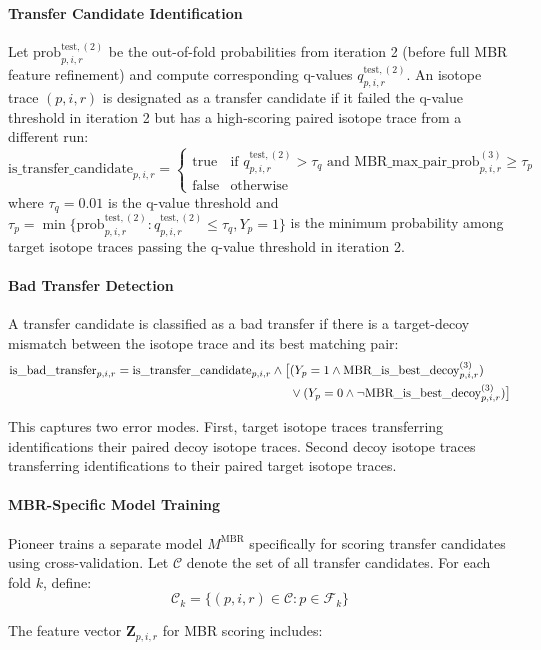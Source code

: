 \documentclass[pdflatex,sn-nature]{sn-jnl}
\begin{document}
\paragraph{Transfer Candidate Identification} Let $\text{prob}_{p,i,r}^{\text{test},(2)}$ be the out-of-fold probabilities from iteration 2 (before full MBR feature refinement) and compute corresponding q-values $q_{p,i,r}^{\text{test},(2)}$. An isotope trace $(p,i,r)$ is designated as a transfer candidate if it failed the q-value threshold in iteration 2 but has a high-scoring paired isotope trace from a different run:
\begin{equation}
  \text{is\_transfer\_candidate}_{p,i,r} = \begin{cases}
      \text{true} & \text{if } q_{p,i,r}^{\text{test},(2)} > \tau_q \text{ and } \text{MBR\_max\_pair\_prob}_{p,i,r}^{(3)} \geq \tau_p \\
      \text{false} & \text{otherwise}
  \end{cases}
\end{equation}
where $\tau_q = 0.01$ is the q-value threshold and $\tau_p = \min\{\text{prob}_{p,i,r}^{\text{test},(2)} : q_{p,i,r}^{\text{test},(2)} \leq \tau_q, Y_p = 1\}$ is the minimum probability among target isotope traces passing the q-value threshold in iteration 2.

\paragraph{Bad Transfer Detection} A transfer candidate is classified as a bad transfer if there is a target-decoy mismatch between the isotope trace and its best matching pair:
\begin{align}
  \text{is\_bad\_transfer}_{p,i,r} = \text{is\_transfer\_candidate}_{p,i,r} \land \big[&(Y_p = 1 \land \text{MBR\_is\_best\_decoy}_{p,i,r}^{(3)}) \notag \\
  &\lor (Y_p = 0 \land \lnot\text{MBR\_is\_best\_decoy}_{p,i,r}^{(3)})\big]
\end{align}

This captures two error modes. First, target isotope traces transferring identifications their paired decoy isotope traces. Second decoy isotope traces transferring identifications to their paired target isotope traces.

\paragraph{MBR-Specific Model Training} Pioneer trains a separate model $M^{\text{MBR}}$ specifically for scoring transfer candidates using cross-validation. Let $\mathcal{C}$ denote the set of all transfer candidates. For each fold $k$, define:
\begin{equation}
  \mathcal{C}_k = \{(p,i,r) \in \mathcal{C} : p \in \mathcal{F}_k\}
\end{equation}

The feature vector $\mathbf{Z}_{p,i,r}$ for MBR scoring includes:
\end{document}
